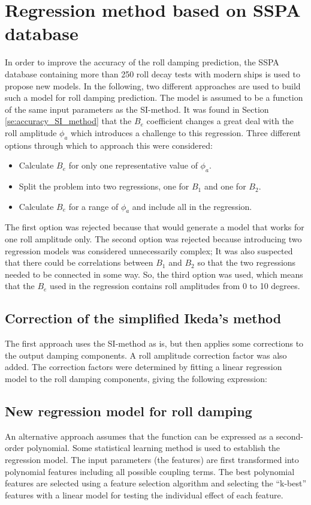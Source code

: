 \section{Regression method based on SSPA database}
\label{se:correction_SI_method}
In order to improve the accuracy of the roll damping prediction, the SSPA database containing more than 250 roll decay tests with modern ships is used to propose new models. In the following, two different approaches are used to build such a model for roll damping prediction. The model is assumed to be a function of the same input parameters as the SI-method. It was found in Section \ref{se:accuracy_SI_method} that the $B_e$ coefficient changes a great deal  with the roll amplitude $\phi_a$ which introduces a challenge to this regression. Three different options through which to approach this were considered:
\begin{itemize}
    \item Calculate $B_e$ for only one representative value of $\phi_a$.
    \item Split the problem into two regressions, one for $B_1$ and one for $B_2$.
    \item Calculate $B_e$ for a range of $\phi_a$ and include all in the regression.
\end{itemize}
The first option was rejected because that would generate a model that works for one roll amplitude only. The second option was rejected because introducing two regression models was considered unnecessarily complex; It was also suspected that there could be correlations between $B_1$ and $B_2$ so that the two regressions needed to be connected in some way. So, the third option was used, which means that the $B_e$ used in the regression contains roll amplitudes from 0 to 10 degrees.  

\subsection{Correction of the simplified Ikeda's method}
The first approach uses the SI-method as is, but then applies some corrections to the output damping components. A roll amplitude correction factor was also added. The correction factors were determined by fitting a linear regression model to the roll damping components, giving the following expression: 


\subsection{New regression model for roll damping}
An alternative approach assumes that the function can be expressed as a second-order polynomial. Some statistical learning method is used to establish the regression model. The input parameters (the features) are first transformed into polynomial features including all possible coupling terms. The best polynomial features are selected using a feature selection algorithm and selecting the ``k-best'' features with a linear model for testing the individual effect of each feature. 

